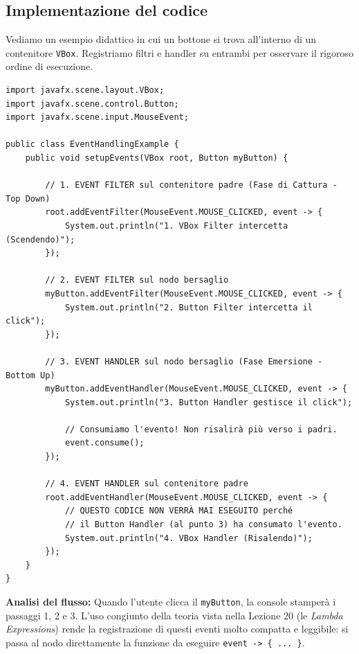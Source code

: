\documentclass[12pt, a4paper]{article}
\begin{document}
\newpage

\subsection{Implementazione del codice}
Vediamo un esempio didattico in cui un bottone si trova all'interno di un contenitore \texttt{VBox}. Registriamo filtri e handler su entrambi per osservare il rigoroso ordine di esecuzione.

\begin{verbatim}
import javafx.scene.layout.VBox;
import javafx.scene.control.Button;
import javafx.scene.input.MouseEvent;

public class EventHandlingExample {
    public void setupEvents(VBox root, Button myButton) {

        // 1. EVENT FILTER sul contenitore padre (Fase di Cattura - Top Down)
        root.addEventFilter(MouseEvent.MOUSE_CLICKED, event -> {
            System.out.println("1. VBox Filter intercetta (Scendendo)");
        });

        // 2. EVENT FILTER sul nodo bersaglio
        myButton.addEventFilter(MouseEvent.MOUSE_CLICKED, event -> {
            System.out.println("2. Button Filter intercetta il click");
        });

        // 3. EVENT HANDLER sul nodo bersaglio (Fase Emersione - Bottom Up)
        myButton.addEventHandler(MouseEvent.MOUSE_CLICKED, event -> {
            System.out.println("3. Button Handler gestisce il click");
            
            // Consumiamo l'evento! Non risalirà più verso i padri.
            event.consume(); 
        });

        // 4. EVENT HANDLER sul contenitore padre
        root.addEventHandler(MouseEvent.MOUSE_CLICKED, event -> {
            // QUESTO CODICE NON VERRÀ MAI ESEGUITO perché 
            // il Button Handler (al punto 3) ha consumato l'evento.
            System.out.println("4. VBox Handler (Risalendo)");
        });
    }
}
\end{verbatim}

\textbf{Analisi del flusso:}
Quando l'utente clicca il \texttt{myButton}, la console stamperà i passaggi 1, 2 e 3. L'uso congiunto della teoria vista nella Lezione 20 (le \textit{Lambda Expressions}) rende la registrazione di questi eventi molto compatta e leggibile: si passa al nodo direttamente la funzione da eseguire \texttt{event -> \{ ... \}}. 

\newpage
\end{document}
